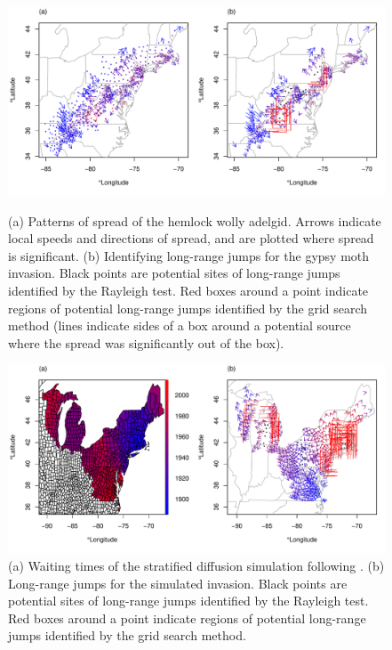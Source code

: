\documentclass[12pt]{article}
\begin{document}
\begin{figure}
\centering
\caption{(a) Patterns of spread of the hemlock wolly adelgid. Arrows indicate local speeds and directions of spread, and are plotted where spread is significant. (b) Identifying long-range jumps for the gypsy moth invasion. Black points are potential sites of long-range jumps identified by the Rayleigh test. Red boxes around a point indicate regions of potential long-range jumps identified by the grid search method (lines indicate sides of a box around a potential source where the spread was significantly out of the box).}
\includegraphics[width=\textwidth]{figures/HWASpread}
\label{fig:hwaspread}
\end{figure}


\begin{figure}[h!]
\centering
\caption{(a) Waiting times of the stratified diffusion simulation following \cite{shigesada1995}. (b) Long-range jumps for the simulated invasion. Black points are potential sites of long-range jumps identified by the Rayleigh test. Red boxes around a point indicate regions of potential long-range jumps identified by the grid search method.}
\label{fig:simspread}
\includegraphics[width=\textwidth]{figures/SimSpread}
\end{figure}

\label{lastpage}
\end{document}

